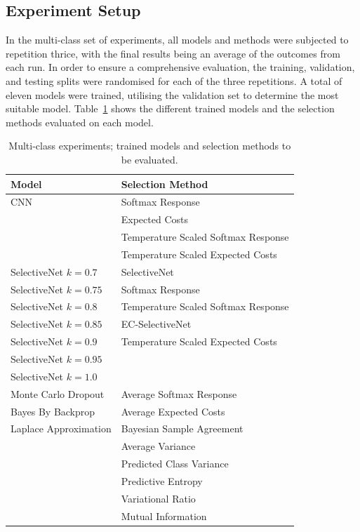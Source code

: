 \subsection{Experiment Setup}
In the multi-class set of experiments, all models and methods were subjected to repetition thrice, with the final results being an average of the outcomes from each run. In order to ensure a comprehensive evaluation, the training, validation, and testing splits were randomised for each of the three repetitions. A total of eleven models were trained, utilising the validation set to determine the most suitable model. Table~\ref{tab:multi-class-experiment-setup} shows the different trained models and the selection methods evaluated on each model.

\begin{table}[h]
	\centering
	\caption{Multi-class experiments; trained models and selection methods to be evaluated.}
	\label{tab:multi-class-experiment-setup}
	\begin{tabular}{|l|l|}
		\hline
		Model & Selection Method \\ \hline
		CNN & Softmax Response \\
		& Expected Costs \\
		& Temperature Scaled Softmax Response \\
		& Temperature Scaled Expected Costs \\ \hline
		SelectiveNet $k=0.7$ & SelectiveNet \\
		SelectiveNet $k=0.75$ & Softmax Response \\
		SelectiveNet $k=0.8$ & Temperature Scaled Softmax Response \\
		SelectiveNet $k=0.85$ & EC-SelectiveNet \\
		SelectiveNet $k=0.9$ & Temperature Scaled Expected Costs \\
		SelectiveNet $k=0.95$ &  \\
		SelectiveNet $k=1.0$ &  \\ \hline
		Monte Carlo Dropout & Average Softmax Response \\
		Bayes By Backprop & Average Expected Costs \\
		Laplace Approximation & Bayesian Sample Agreement \\
		& Average Variance \\
		& Predicted Class Variance \\
		& Predictive Entropy \\
		& Variational Ratio \\
		& Mutual Information \\ \hline
	\end{tabular}
\end{table}

